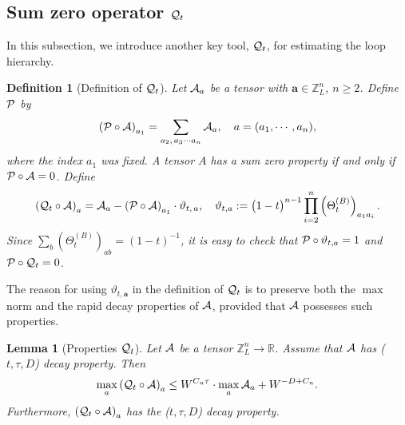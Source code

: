 \documentclass[10pt,reqno]{article}
\theoremstyle{plain} %
\newtheorem{lemma}[theorem]{Lemma}
\newtheorem{definition}[theorem]{Definition}
\theoremstyle{remark}
\numberwithin{equation}{section}
\begin{document}
 

\subsection{Sum zero operator \texorpdfstring{${\cal Q}_t$}{Qt}}
In this subsection, we introduce another key tool, ${\cal Q}_t$,  for estimating the loop hierarchy. 
\begin{definition}[Definition of ${\cal Q}_t$]\label{Def:QtPt} Let ${\cal A}_\textbf{a}$ be a tensor with $\textbf{a}\in\mathbb Z_L^n$, $n\ge 2$.   Define ${\cal P}$  by
$$
\left( {\cal P} \circ {\cal A}\right)_{a_1}= \sum_{a_2,\, a_3\cdots a_n}  {\cal A}_{\textbf{a}} ,\quad \textbf{a}=(a_1,\cdots,a_n), 
$$
where the index $a_1$ was fixed. A tensor $A$ has a sum zero property if and only if $ {\cal P} \circ {\cal A}= 0$.   Define 
$$
 \left({\cal Q}_t\circ {\cal A}\right)_{\textbf{a}}={\cal A}_{\textbf{a}}-\left({\cal P} \circ {\cal A}\right)_{a_1}
 \cdot {  \vartheta}_{t,\,\textbf{a}},\quad 
 {  \vartheta}_{t, \textbf{a}}:=\big(1-t\big)^{n-1}\prod_{i=2}^n \left(\Theta^{(B)}_t\right)_{a_1a_i}.
$$
Since $\sum_b\left(\Theta^{(B)}_t\right)_{ab}=(1-t)^{-1}$, it is easy to check that $ {\cal P} \circ  \vartheta_{t,\textbf{a}}=1$ 
and  ${\cal P} \circ {\cal Q}_t =0$. 
\end{definition}
The reason for using $\vartheta_{t,\textbf{a}}$ in the definition of ${\cal Q}_t$ is to preserve both  the $\max$ norm and the rapid decay properties of ${\cal A}$, provided that ${\cal A}$ possesses such properties.

\begin{lemma}[Properties ${\cal Q}_t$]\label{lem_+Q} 
Let  $\cal A$ be a tensor $\mathbb Z_L^n\to \mathbb R$. Assume that  $\cal A$ has ($t, \tau, D$) decay property. %
Then  
\begin{align}\label{normQA}
        \max_{\textbf{a}} \left({\cal Q}_t\circ \cal A\right)_{\textbf{a}} \le W^{C_n \tau} \cdot \max_{\textbf{a}} {\cal A}_{\textbf{a}}+W^{-D+C_n}. 
\end{align}
Furthermore,   
$\left({\cal Q}_t\circ \cal A\right)_{\textbf{a}}$ has the ($ t, \tau, D$) decay property. 
\end{lemma}
\end{document}
